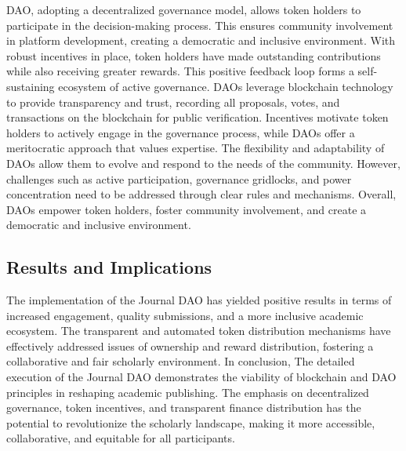 \documentclass[lettersize,journal]{IEEEtran}
\begin{document}
DAO, adopting a decentralized governance model, allows token holders to participate in the decision-making process. This ensures community involvement in platform development, creating a democratic and inclusive environment. With robust incentives in place, token holders have made outstanding contributions while also receiving greater rewards. This positive feedback loop forms a self-sustaining ecosystem of active governance. DAOs leverage blockchain technology to provide transparency and trust, recording all proposals, votes, and transactions on the blockchain for public verification. Incentives motivate token holders to actively engage in the governance process, while DAOs offer a meritocratic approach that values expertise. The flexibility and adaptability of DAOs allow them to evolve and respond to the needs of the community. However, challenges such as active participation, governance gridlocks, and power concentration need to be addressed through clear rules and mechanisms. Overall, DAOs empower token holders, foster community involvement, and create a democratic and inclusive environment.

\subsection{Results and Implications}

The implementation of the Journal DAO has yielded positive results in terms of increased engagement, quality submissions, and a more inclusive academic ecosystem. The transparent and automated token distribution mechanisms have effectively addressed issues of ownership and reward distribution, fostering a collaborative and fair scholarly environment.
In conclusion, The detailed execution of the Journal DAO demonstrates the viability of blockchain and DAO principles in reshaping academic publishing. The emphasis on decentralized governance, token incentives, and transparent finance distribution has the potential to revolutionize the scholarly landscape, making it more accessible, collaborative, and equitable for all participants.
\end{document}
